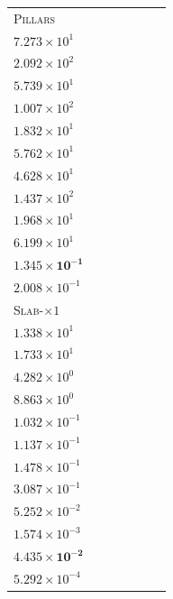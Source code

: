 \begin{table}[p]
{\begin{tabular}{lcccccc}
\textsc{Pillars} & \shortstack{$9.242\!\times\!10^{-2}$\\$7.273\!\times\!10^{1}$\\$2.092\!\times\!10^{2}$} & \shortstack{$2.900\!\times\!10^{-1}$\\$5.739\!\times\!10^{1}$\\$1.007\!\times\!10^{2}$} & \shortstack{$9.190\!\times\!10^{-2}$\\$1.832\!\times\!10^{1}$\\$5.762\!\times\!10^{1}$} & \shortstack{$2.335\!\times\!10^{-1}$\\$4.628\!\times\!10^{1}$\\$1.437\!\times\!10^{2}$} & \shortstack{$8.134\!\times\!10^{-2}$\\$1.968\!\times\!10^{1}$\\$6.199\!\times\!10^{1}$} & \shortstack{$\mathbf{7.128\!\times\!10^{-2}}$\\$\mathbf{1.345\!\times\!10^{-1}}$\\$2.008\!\times\!10^{-1}$} \\
\rowcolor{black!6}
\textsc{Slab-$\times 1$} & \shortstack{$7.981\!\times\!10^{-2}$\\$1.338\!\times\!10^{1}$\\$1.733\!\times\!10^{1}$} & \shortstack{$8.043\!\times\!10^{-2}$\\$4.282\!\times\!10^{0}$\\$8.863\!\times\!10^{0}$} & \shortstack{$5.356\!\times\!10^{-2}$\\$1.032\!\times\!10^{-1}$\\$1.137\!\times\!10^{-1}$} & \shortstack{$4.636\!\times\!10^{-2}$\\$1.478\!\times\!10^{-1}$\\$3.087\!\times\!10^{-1}$} & \shortstack{$5.258\!\times\!10^{-2}$\\$5.252\!\times\!10^{-2}$\\$1.574\!\times\!10^{-3}$} & \shortstack{$\mathbf{4.435\!\times\!10^{-2}}$\\$\mathbf{4.435\!\times\!10^{-2}}$\\$5.292\!\times\!10^{-4}$} \\

\end{tabular}}
\end{table}
